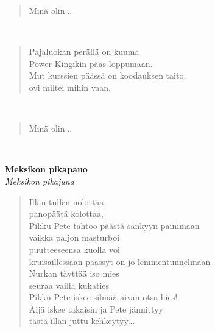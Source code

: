 \noindent\begin{minipage}{\linewidth}
\begin{verse}
	Minä olin...\\
\end{verse}
\end{minipage}\\[10pt]
\noindent\begin{minipage}{\linewidth}
\begin{verse}
	Pajaluokan perällä on kuuma\\
	Power Kingikin pääs loppumaan.\\
	Mut kurssien päässä on koodauksen taito,\\
	ovi miltei mihin vaan.\\
\end{verse}
\end{minipage}\\[10pt]
\noindent\begin{minipage}{\linewidth}
\begin{verse}
	Minä olin...\\
\end{verse}
\end{minipage}\\[10pt]
%
%
\noindent\begin{minipage}{\linewidth}
\vspace{5pt}
\parbox[t]{0.85\linewidth}{\raggedright {\large\bf Meksikon pikapano}\\[2pt]\small\emph{Meksikon pikajuna}\\[6pt]}
\begin{verse}
	
	Illan tullen nolottaa,\\
	panopäätä kolottaa,\\
	Pikku-Pete tahtoo päästä sänkyyn painimaan\\
	vaikka paljon masturboi\\
	puutteeseensa kuolla voi\\
	kruisaillessaan päässyt on jo lemmentunnelmaan\\
	Nurkan täyttää iso mies\\
	seuraa vailla kukaties\\
	Pikku-Pete iskee silmää aivan otsa hies!\\
	Äijä iskee takaisin ja Pete jännittyy\\
	tästä illan juttu kehkeytyy...\\
\end{verse}
\end{minipage}\\[10pt]
